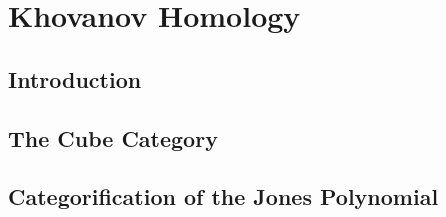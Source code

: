 \chapter{Khovanov Homology}

\section{Introduction}

\section{The Cube Category}

\section{Categorification of the Jones Polynomial}

\section{}

\section{}

\section{}

\section{}

